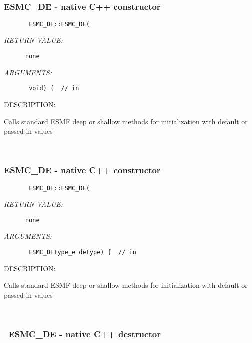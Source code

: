  
\mbox{}\hrulefill\ 
 
\subsubsection{ESMC\_DE - native C++ constructor}


  
\begin{verbatim}       ESMC_DE::ESMC_DE(\end{verbatim}{\em RETURN VALUE:}
\begin{verbatim}      none\end{verbatim}{\em ARGUMENTS:}
\begin{verbatim}       void) {  // in\end{verbatim}
{\sf DESCRIPTION:\\ }


        Calls standard ESMF deep or shallow methods for initialization
        with default or passed-in values
   
 
\mbox{}\hrulefill\ 
 
\subsubsection{ESMC\_DE - native C++ constructor}


  
\begin{verbatim}       ESMC_DE::ESMC_DE(\end{verbatim}{\em RETURN VALUE:}
\begin{verbatim}      none\end{verbatim}{\em ARGUMENTS:}
\begin{verbatim}       ESMC_DEType_e detype) {  // in\end{verbatim}
{\sf DESCRIPTION:\\ }


        Calls standard ESMF deep or shallow methods for initialization
        with default or passed-in values
   
 
\mbox{}\hrulefill\ 
 
\subsubsection{~ESMC\_DE - native C++ destructor}


